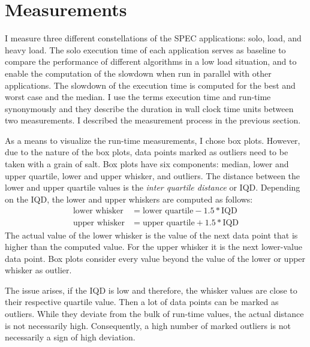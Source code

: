 \section{Measurements}
\label{eval:measurements}

I measure three different constellations of the SPEC applications: solo, load,
and heavy load.
The solo execution time of each application serves as baseline to compare the
performance of different algorithms in a low load situation, and to enable the
computation of the slowdown when run in parallel with other applications.
The slowdown of the execution time is computed for the best and worst
case and the median.
I use the terms execution time and run-time synonymously and they describe the
duration in wall clock time units between two measurements.
I described the measurement process in the previous section.

As a means to visualize the run-time measurements, I chose box plots.
However, due to the nature of the box plots, data points marked as outliers need
to be taken with a grain of salt.
Box plots have six components: median, lower and upper quartile, lower and
upper whisker, and outliers.
The distance between the lower and upper quartile values is the \emph{inter
quartile distance} or IQD.
Depending on the IQD, the lower and upper whiskers are computed as follows:
%
\begin{align*}
  \text{lower whisker} &= \text{lower quartile} - 1.5 * \text{IQD}\\
  \text{upper whisker} &= \text{upper quartile} + 1.5 * \text{IQD}
\end{align*}
%
The actual value of the lower whisker is the value of the next data point
that is higher than the computed value.
For the upper whisker it is the next lower-value data point.
Box plots consider every value beyond the value of the lower or upper whisker
as outlier.

The issue arises, if the IQD is low and therefore, the whisker values are close
to their respective quartile value.
Then a lot of data points can be marked as outliers.
While they deviate from the bulk of run-time values, the actual distance
is not necessarily high.
Consequently, a high number of marked outliers is not necessarily a sign of
high deviation.

